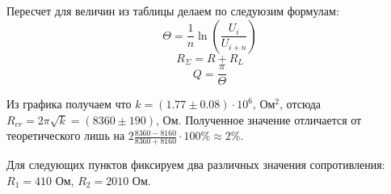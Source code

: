 \documentclass[a4paper,12pt]{extarticle}
\begin{document}
Пересчет для величин из таблицы делаем по следуюзим формулам: 
\begin{equation}
    \Theta = \frac{1}{n} \ln\left(\frac{U_i}{U_{i+n}}\right)
    \label{eq:Theta}
\end{equation}
\begin{equation}
    R_\Sigma = R + R_L
    \label{eq:Rsigma}
\end{equation}
\begin{equation}
    Q = \frac{\pi}{\Theta}
    \label{eq:Q_exper}
\end{equation}
\begin{minipage}{1\textwidth}
    \end{minipage}
Из графика получаем что $k = (1.77\pm0.08) \cdot 10^6$, Ом$^2$, отсюда $R_{cr} = 2\pi \sqrt{k} = (8360\pm190)$, Ом. Полученное значение отличается от теоретического лишь на $2\frac{8360-8160}{8360+8160}\cdot 100\% \approx 2\%$.

Для следующих пунктов фиксируем два различных значения сопротивления: $R_1 = 410$ Ом, $R_2 = 2010$ Ом.
\end{document}
